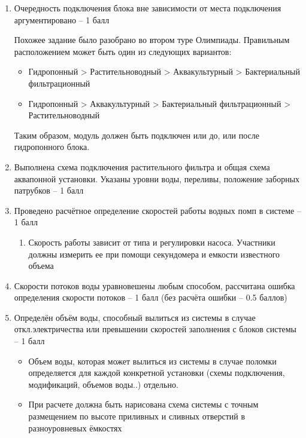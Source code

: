 \begin{enumerate}
    \item 	Очередность подключения блока вне зависимости от места подключения аргументировано – 1 балл

    Похожее задание было разобрано во втором туре Олимпиады. Правильным расположением может быть один из следующих вариантов: 
        
        \begin{itemize}
            \item Гидропонный > Растительноводный > Аквакультурный  > Бактериальный фильтрационный
            \item Гидропонный >  Аквакультурный  > Бактериальный фильтрационный > Растительноводный
        \end{itemize}    
    Таким образом, модуль должен быть подключен или до, или после гидропонного блока. 
    
    \item  	Выполнена схема подключения растительного фильтра и общая схема аквапонной установки. Указаны уровни воды, переливы, положение заборных патрубков – 1 балл

    \item  	Проведено расчётное определение скоростей работы водных помп в системе – 1 балл
            \begin{enumerate}
                \item Скорость работы зависит от типа и регулировки насоса. Участники должны измерить ее при помощи секундомера и емкости известного объема
            \end{enumerate}

    \item 	Скорости потоков воды уравновешены любым способом, рассчитана ошибка определения скорости потоков – 1 балл (без расчёта ошибки – 0.5 баллов)
    
    \item   Определён объём воды, способный вылиться из системы в случае откл.электричества или превышении скоростей заполнения с блоков системы – 1 балл 
            \begin{itemize}
                
                \item Объем воды, которая может вылиться из системы в случае поломки определяется для каждой конкретной установки (схемы подключения, модификаций, объемов воды..) отдельно.
            
                \item  При расчете должна быть нарисована схема системы с точным размещением по высоте приливных и сливных отверстий в разноуровневых ёмкостях
            

\end{itemize}
\end{enumerate}
